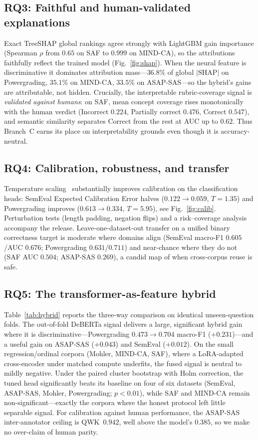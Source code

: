\documentclass[10pt,twocolumn]{article}
\begin{document}
\subsection{RQ3: Faithful and human-validated explanations}
Exact TreeSHAP global rankings agree strongly with LightGBM gain importance
(Spearman $\rho$ from $0.65$ on SAF to $0.999$ on MIND-CA), so the attributions
faithfully reflect the trained model (Fig.~\ref{fig:shap}). When the neural
feature is discriminative it dominates attribution mass---$36.8\%$ of global
$|\text{SHAP}|$ on Powergrading, $35.1\%$ on MIND-CA, $33.5\%$ on ASAP-SAS---so
the hybrid's gains are attributable, not hidden. Crucially, the interpretable
rubric-coverage signal is \emph{validated against humans}: on SAF, mean concept
coverage rises monotonically with the human verdict (Incorrect $0.224$, Partially
correct $0.476$, Correct $0.547$), and semantic similarity separates Correct from
the rest at AUC up to $0.62$. Thus Branch~C earns its place on interpretability
grounds even though it is accuracy-neutral.

\subsection{RQ4: Calibration, robustness, and transfer}
Temperature scaling~\cite{guo2017calibration} substantially improves calibration
on the classification heads: SemEval Expected Calibration Error halves
($0.122\!\rightarrow\!0.059$, $T=1.35$) and Powergrading improves
($0.613\!\rightarrow\!0.334$, $T=5.95$), see Fig.~\ref{fig:calib}. Perturbation
tests (length padding, negation flips) and a risk--coverage analysis accompany the
release. Leave-one-dataset-out transfer on a unified binary correctness target is
moderate where domains align (SemEval macro-F1 $0.605$/AUC $0.676$; Powergrading
$0.631$/$0.711$) and near-chance where they do not (SAF AUC $0.504$; ASAP-SAS
$0.269$), a candid map of when cross-corpus reuse is safe.

\subsection{RQ5: The transformer-as-feature hybrid}
Table~\ref{tab:hybrid} reports the three-way comparison on identical
unseen-question folds. The out-of-fold DeBERTa signal delivers a large,
significant hybrid gain where it is discriminative---Powergrading
$0.473\!\rightarrow\!0.704$ macro-F1 ($+0.231$)---and a useful gain on ASAP-SAS
($+0.043$) and SemEval ($+0.012$). On the small regression/ordinal corpora
(Mohler, MIND-CA, SAF), where a LoRA-adapted cross-encoder under matched compute
underfits, the fused signal is neutral to mildly negative. Under the paired
cluster bootstrap with Holm correction, the tuned head significantly beats its
baseline on four of six datasets (SemEval, ASAP-SAS, Mohler, Powergrading;
$p<0.01$), while SAF and MIND-CA remain non-significant---exactly the corpora
where the honest protocol left little separable signal. For calibration against
human performance, the ASAP-SAS inter-annotator ceiling is QWK~$0.942$, well above
the model's $0.385$, so we make no over-claim of human parity.
\end{document}
